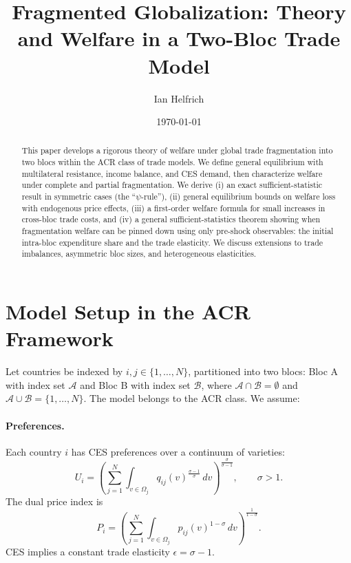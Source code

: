 \documentclass[11pt]{article}
\title{Fragmented Globalization: Theory and Welfare in a Two-Bloc Trade Model}
\author{Ian Helfrich}
\date{\today}
\begin{document}
\maketitle

\begin{abstract}
This paper develops a rigorous theory of welfare under global trade fragmentation into two blocs within the ACR class of trade models. We define general equilibrium with multilateral resistance, income balance, and CES demand, then characterize welfare under complete and partial fragmentation. We derive (i) an exact sufficient-statistic result in symmetric cases (the ``$\psi$-rule''), (ii) general equilibrium bounds on welfare loss with endogenous price effects, (iii) a first-order welfare formula for small increases in cross-bloc trade costs, and (iv) a general sufficient-statistics theorem showing when fragmentation welfare can be pinned down using only pre-shock observables: the initial intra-bloc expenditure share and the trade elasticity. We discuss extensions to trade imbalances, asymmetric bloc sizes, and heterogeneous elasticities.
\end{abstract}

\section{Model Setup in the ACR Framework}

Let countries be indexed by $i,j \in \{1,\dots,N\}$, partitioned into two blocs: Bloc A with index set $\mathcal{A}$ and Bloc B with index set $\mathcal{B}$, where $\mathcal{A} \cap \mathcal{B} = \emptyset$ and $\mathcal{A} \cup \mathcal{B} = \{1,\dots,N\}$. The model belongs to the ACR class. We assume:

\paragraph{Preferences.}
Each country $i$ has CES preferences over a continuum of varieties:
\begin{equation}
U_i = \left(\sum_{j=1}^N \int_{v \in \Omega_j} q_{ij}(v)^{\frac{\sigma-1}{\sigma}} \, dv \right)^{\frac{\sigma}{\sigma-1}}, \qquad \sigma>1.
\end{equation}
The dual price index is
\begin{equation}
P_i = \left(\sum_{j=1}^N \int_{v \in \Omega_j} p_{ij}(v)^{1-\sigma}\, dv\right)^{\frac{1}{1-\sigma}}.
\end{equation}
CES implies a constant trade elasticity $\epsilon = \sigma-1$.
\end{document}
